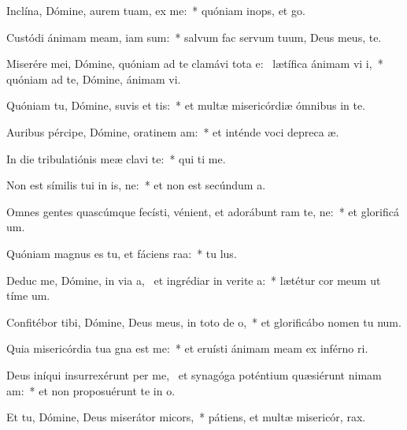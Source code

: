 \item Inclína, Dómine, aurem tuam,  ex me:~* quóniam inops, et   go.
\item Custódi ánimam meam, iam  sum:~* salvum fac servum tuum, Deus meus,   te.
\item Miserére mei, Dómine, quóniam ad te clamávi tota e:~\pscross{} lætífica ánimam vi i,~* quóniam ad te, Dómine, ánimam  vi.
\item Quóniam tu, Dómine, suvis et tis:~* et multæ misericórdiæ ómnibus in te.
\item Auribus pércipe, Dómine, oratinem am:~* et inténde voci depreca æ.
\item In die tribulatiónis meæ clavi  te:~* qui ti me.
\item Non est símilis tui in is, ne:~* et non est secúndum  a.
\item Omnes gentes quascúmque fecísti, vénient, et adorábunt ram te, ne:~* et glorificá  um.
\item Quóniam magnus es tu, et fáciens raa:~* tu   lus.
\item Deduc me, Dómine, in via a,~\pscross{} et ingrédiar in verite a:~* lætétur cor meum ut tíme  um.
\item Confitébor tibi, Dómine, Deus meus, in toto de o,~* et glorificábo nomen tu  num.
\item Quia misericórdia tua gna est  me:~* et eruísti ánimam meam ex inférno ri.
\item Deus iníqui insurrexérunt per me,~\pscross{} et synagóga poténtium quæsiérunt nimam am:~* et non proposuérunt te in  o.
\item Et tu, Dómine, Deus miserátor  micors,~* pátiens, et multæ misericór,  rax.
